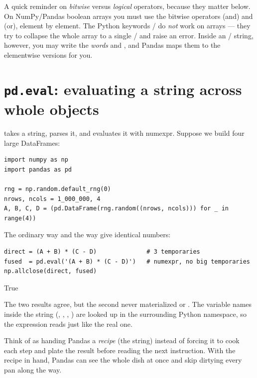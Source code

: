 \documentclass[11pt]{article}
\begin{document}
\begin{pyrefresh}
A quick reminder on \emph{bitwise} versus \emph{logical} operators, because they matter below. On NumPy/Pandas boolean arrays you must use the bitwise operators \code{&} (and) and \code{|} (or), element by element. The Python keywords / do \emph{not} work on arrays --- they try to collapse the whole array to a single / and raise an error. Inside an / string, however, you may write the \emph{words}  and , and Pandas maps them to the elementwise versions for you.
\end{pyrefresh}

\section{\texttt{pd.eval}: evaluating a string across whole objects}

 takes a string, parses it, and evaluates it with numexpr. Suppose we build four large DataFrames:

\begin{lstlisting}
import numpy as np
import pandas as pd

rng = np.random.default_rng(0)
nrows, ncols = 1_000_000, 4
A, B, C, D = (pd.DataFrame(rng.random((nrows, ncols))) for _ in range(4))
\end{lstlisting}

The ordinary way and the  way give identical numbers:

\begin{lstlisting}
direct = (A + B) * (C - D)              # 3 temporaries
fused  = pd.eval('(A + B) * (C - D)')   # numexpr, no big temporaries
np.allclose(direct, fused)
\end{lstlisting}

\begin{outblock}
True
\end{outblock}

The two results agree, but the second never materialized  or . The variable names inside the string (, , , ) are looked up in the surrounding Python namespace, so the expression reads just like the real one.

\begin{intuition}
Think of  as handing Pandas a \emph{recipe} (the string) instead of forcing it to cook each step and plate the result before reading the next instruction. With the recipe in hand, Pandas can see the whole dish at once and skip dirtying every pan along the way.
\end{intuition}
\end{document}
